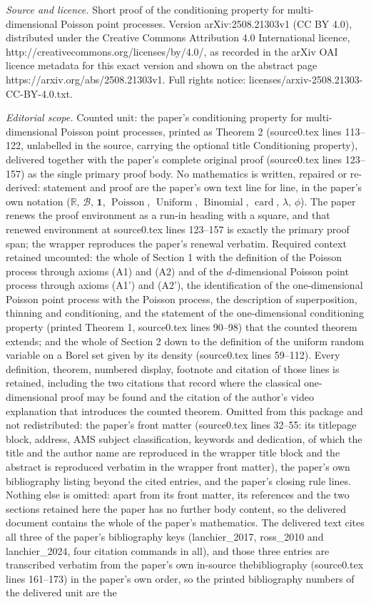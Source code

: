 \documentclass[10pt,a4paper]{amsart}
\newcommand{\R}{\mathbb{R}}
\newcommand{\B}{\mathscr{B}}
\newcommand{\ind}{\mathbf{1}}
\DeclareMathOperator{\poisson}{Poisson}
\DeclareMathOperator{\uniform}{Uniform}
\DeclareMathOperator{\binomial}{Binomial}
\DeclareMathOperator{\card}{card}
\begin{document}
\noindent\emph{Source and licence.} Short proof of the conditioning property for multi-dimensional Poisson point processes. Version arXiv:2508.21303v1 (CC BY 4.0), distributed under the Creative Commons Attribution 4.0 International licence, http://creativecommons.org/licenses/by/4.0/, as recorded in the arXiv OAI licence metadata for this exact version and shown on the abstract page https://arxiv.org/abs/2508.21303v1. Full rights notice: licenses/arxiv-2508.21303-CC-BY-4.0.txt.\par\smallskip
\noindent\textit{Editorial scope.} Counted unit: the paper's conditioning property for multi-dimensional Poisson point processes, printed as Theorem 2 (source0.tex lines 113--122, unlabelled in the source, carrying the optional title Conditioning property), delivered together with the paper's complete original proof (source0.tex lines 123--157) as the single primary proof body. No mathematics is written, repaired or re-derived: statement and proof are the paper's own text line for line, in the paper's own notation ($\R$, $\B$, $\ind$, $\poisson$, $\uniform$, $\binomial$, $\card$, $\lambda$, $\phi$). The paper renews the proof environment as a run-in heading with a square, and that renewed environment at source0.tex lines 123--157 is exactly the primary proof span; the wrapper reproduces the paper's renewal verbatim. Required context retained uncounted: the whole of Section 1 with the definition of the Poisson process through axioms (A1) and (A2) and of the $d$-dimensional Poisson point process through axioms (A1') and (A2'), the identification of the one-dimensional Poisson point process with the Poisson process, the description of superposition, thinning and conditioning, and the statement of the one-dimensional conditioning property (printed Theorem 1, source0.tex lines 90--98) that the counted theorem extends; and the whole of Section 2 down to the definition of the uniform random variable on a Borel set given by its density (source0.tex lines 59--112). Every definition, theorem, numbered display, footnote and citation of those lines is retained, including the two citations that record where the classical one-dimensional proof may be found and the citation of the author's video explanation that introduces the counted theorem. Omitted from this package and not redistributed: the paper's front matter (source0.tex lines 32--55: its titlepage block, address, AMS subject classification, keywords and dedication, of which the title and the author name are reproduced in the wrapper title block and the abstract is reproduced verbatim in the wrapper front matter), the paper's own bibliography listing beyond the cited entries, and the paper's closing rule lines. Nothing else is omitted: apart from its front matter, its references and the two sections retained here the paper has no further body content, so the delivered document contains the whole of the paper's mathematics. The delivered text cites all three of the paper's bibliography keys (lanchier\_2017, ross\_2010 and lanchier\_2024, four citation commands in all), and those three entries are transcribed verbatim from the paper's own in-source thebibliography (source0.tex lines 161--173) in the paper's own order, so the printed bibliography numbers of the delivered unit are the 
\end{document}

